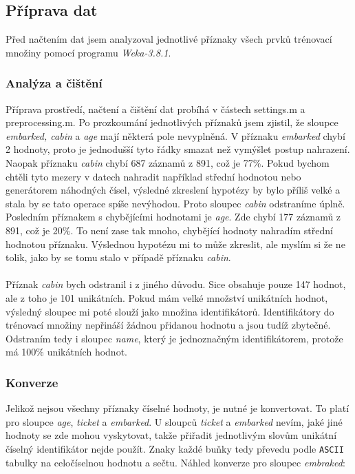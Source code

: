 \documentclass[a4]{article}
\begin{document}
\subsection{Příprava dat}
Před načtením dat jsem analyzoval jednotlivé příznaky všech prvků trénovací množiny pomocí programu \textit{Weka-3.8.1}.

\subsubsection{Analýza a čištění}

Příprava prostředí, načtení a čištění dat probíhá v částech settings.m a preprocessing.m. Po prozkoumání jednotlivých příznaků jsem zjistil, že sloupce \textit{embarked, cabin} a \textit{age} mají některá pole nevyplněná. V příznaku \textit{embarked} chybí 2 hodnoty, proto je jednodušší tyto řádky smazat než vymýšlet postup nahrazení. Naopak příznaku \textit{cabin} chybí 687 záznamů z 891, což je 77\%. Pokud bychom chtěli tyto mezery v datech nahradit například střední hodnotou nebo generátorem náhodných čísel, výsledné zkreslení hypotézy by bylo příliš velké a stala by se tato operace spíše nevýhodou. Proto sloupec \textit{cabin} odstraníme úplně. Posledním příznakem s chybějícími hodnotami je \textit{age}. Zde chybí 177 záznamů z 891, což je 20\%. To není zase tak mnoho, chybějící hodnoty nahradím střední hodnotou příznaku. Výslednou hypotézu mi to může zkreslit, ale myslím si že ne tolik, jako by se tomu stalo v případě příznaku \textit{cabin}.
\\\\
Příznak \textit{cabin} bych odstranil i z jiného důvodu. Sice obsahuje pouze 147 hodnot, ale z toho je 101 unikátních. Pokud mám velké množství unikátních hodnot, výsledný sloupec mi poté slouží jako množina identifikátorů. Identifikátory do trénovací množiny nepřináší žádnou přidanou hodnotu a jsou tudíž zbytečné. Odstraním tedy i sloupec \textit{name}, který je jednoznačným identifikátorem, protože má 100\% unikátních hodnot.

\subsubsection{Konverze}
Jelikož nejsou všechny příznaky číselné hodnoty, je nutné je konvertovat. To platí pro sloupce \textit{age}, \textit{ticket} a \textit{embarked}. U sloupců \textit{ticket} a \textit{embarked} nevím, jaké jiné hodnoty se zde mohou vyskytovat, takže přiřadit jednotlivým slovům unikátní číselný identifikátor nejde použít. Znaky každé buňky tedy převedu podle \texttt{ASCII} tabulky na celočíselnou hodnotu a sečtu. Náhled konverze pro sloupec \textit{embraked}:
\end{document}
